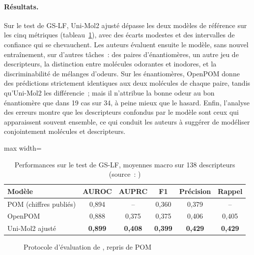 \paragraph{Résultats.}
Sur le test de GS-LF, Uni-Mol2 ajusté dépasse les deux modèles de référence sur les cinq métriques (tableau~\ref{tab:ResultatsLitterature}), avec des écarts modestes et des intervalles de confiance qui se chevauchent.
Les auteurs évaluent ensuite le modèle, sans nouvel entraînement, sur d'autres tâches~: des paires d'énantiomères, un autre jeu de descripteurs, la distinction entre molécules odorantes et inodores, et la discriminabilité de mélanges d'odeurs.
Sur les énantiomères, OpenPOM donne des prédictions strictement identiques aux deux molécules de chaque paire, tandis qu'Uni-Mol2 les différencie~; mais il n'attribue la bonne odeur au bon énantiomère que dans 19 cas sur 34, à peine mieux que le hasard.
Enfin, l'analyse des erreurs montre que les descripteurs confondus par le modèle sont ceux qui apparaissent souvent ensemble, ce qui conduit les auteurs à suggérer de modéliser conjointement molécules et descripteurs.

\begin{table}
   \centering
   \begin{adjustbox}{max width=\linewidth}
   \begin{tabular}{|l||c|c|c|c|c|}
      \hline
      Modèle & AUROC & AUPRC & F1 & Précision & Rappel \\
      \hline
      \hline
      POM (chiffres publiés) & 0,894 & -- & 0,360 & 0,379 & -- \\
      \hline
      OpenPOM & 0,888 & 0,375 & 0,375 & 0,406 & 0,405 \\
      \hline
      Uni-Mol2 ajusté & \textbf{0,899} & \textbf{0,408} & \textbf{0,399} & \textbf{0,429} & \textbf{0,429} \\
      \hline
   \end{tabular}
   \end{adjustbox}
   \caption{Performances sur le test de GS-LF, moyennes macro sur 138 descripteurs (source~: \cite{Han-2026})}
   \label{tab:ResultatsLitterature}
\end{table}

\begin{figure}
   \centering
   \caption{Protocole d'évaluation de \cite{Han-2026}, repris de POM}
   \label{fig:ProtocoleHan}
\end{figure}


